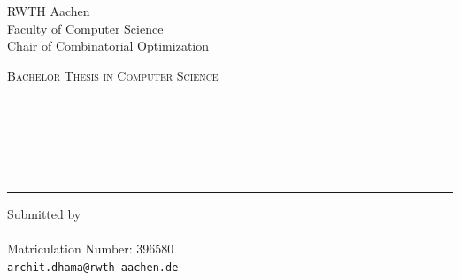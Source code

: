 % 

\begin{titlepage}
\centering

\vspace*{1cm}

{\large RWTH Aachen}\\[0.3cm]
{\large Faculty of Computer Science}\\[0.3cm]
{\large Chair of Combinatorial Optimization}\\[0.3cm]

\vspace{1.5cm}

{\Large\scshape Bachelor Thesis in Computer Science}\\[0.5cm]

\vspace{1.0cm}

{\color{RWTHBlue}\rule{\textwidth}{1.5pt}}\\[0.4cm]

{\huge\bfseries \thesisTitleMain}\\[0.4cm]

{\Large\color{RWTHBlue20} \thesisTitleSubA\\[0.2cm] \thesisTitleSubB}\\[0.4cm]

{\color{RWTHBlue}\rule{\textwidth}{1.5pt}}

\vspace{1.5cm}

{\large Submitted by}\\[0.3cm]
{\Large\bfseries \thesisAuthor}\\[0.2cm]
{\large Matriculation Number: 396580}\\[0.2cm]
{\large \texttt{archit.dhama@rwth-aachen.de}}


\end{titlepage}
